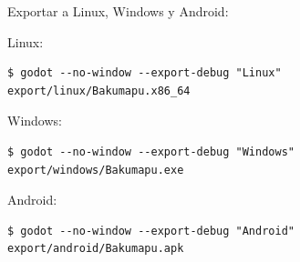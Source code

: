 Exportar a Linux, Windows y Android:

Linux:
\begin{lstlisting}
$ godot --no-window --export-debug "Linux" export/linux/Bakumapu.x86_64
\end{lstlisting}

Windows:
\begin{lstlisting}
$ godot --no-window --export-debug "Windows" export/windows/Bakumapu.exe
\end{lstlisting}

Android:
\begin{lstlisting}
$ godot --no-window --export-debug "Android" export/android/Bakumapu.apk
\end{lstlisting}
